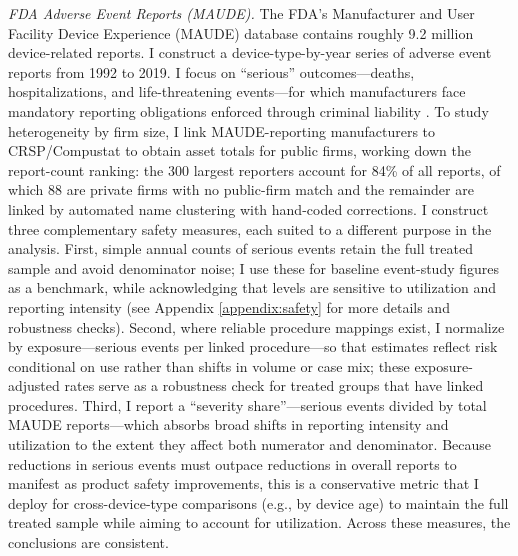 \documentclass[letterpaper,12pt]{article}
\theoremstyle{definition}
\begin{document}
\textit{FDA Adverse Event Reports (MAUDE).} The FDA’s Manufacturer and User Facility Device Experience (MAUDE) database contains roughly 9.2 million device-related reports. I construct a device-type-by-year series of adverse event reports from 1992 to 2019. I focus on “serious” outcomes---deaths, hospitalizations, and life-threatening events---for which manufacturers face mandatory reporting obligations enforced through criminal liability \citep{bragg_florence_chan_2018}. To study heterogeneity by firm size, I link MAUDE-reporting manufacturers to CRSP/Compustat to obtain asset totals for public firms, working down the report-count ranking: the 300 largest reporters account for 84\% of all reports, of which 88 are private firms with no public-firm match and the remainder are linked by automated name clustering with hand-coded corrections. I construct three complementary safety measures, each suited to a different purpose in the analysis. First, simple annual counts of serious events retain the full treated sample and avoid denominator noise; I use these for baseline event-study figures as a benchmark, while acknowledging that levels are sensitive to utilization and reporting intensity (see Appendix \ref{appendix:safety} for more details and robustness checks). Second, where reliable procedure mappings exist, I normalize by exposure---serious events per linked procedure---so that estimates reflect risk conditional on use rather than shifts in volume or case mix; these exposure-adjusted rates serve as a robustness check for treated groups that have linked procedures. Third, I report a “severity share”---serious events divided by total MAUDE reports---which absorbs broad shifts in reporting intensity and utilization to the extent they affect both numerator and denominator. Because reductions in serious events must outpace reductions in overall reports to manifest as product safety improvements, this is a conservative metric that I deploy for cross-device-type comparisons (e.g., by device age) to maintain the full treated sample while aiming to account for utilization. Across these measures, the conclusions are consistent.
\end{document}
